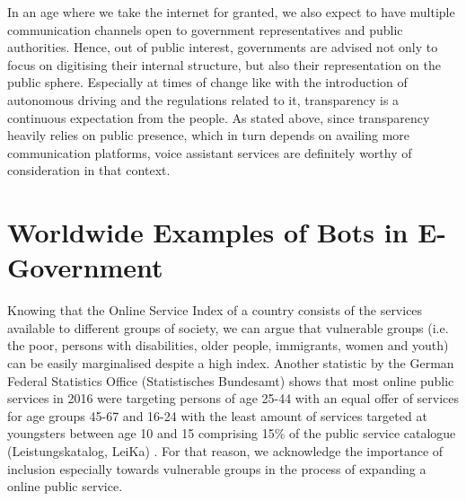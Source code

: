 In an age where we
take the internet for granted,
we also expect to have multiple communication channels open to government representatives and public authorities. 
%
Hence, out of public interest, governments are advised not only to focus on digitising their internal structure, but also their representation on the public sphere.
Especially at times of change like with the introduction of autonomous driving and the regulations related to it, transparency is a continuous expectation from the people. As stated above, since transparency heavily relies on public presence, which in turn depends on availing more communication platforms, voice assistant services are definitely worthy of consideration in that context.




\section{Worldwide Examples of Bots in E-Government}

Knowing that the Online Service Index of a country consists of the services available to different groups of society, we can argue that 
vulnerable groups (i.e. the poor, persons with disabilities, older people, immigrants, women and youth) can be easily marginalised despite a high index. Another statistic by the German Federal Statistics Office (Statistisches Bundesamt) shows that most online public services in 2016 were targeting persons of age 25-44 with an equal offer of services for age groups 45-67 and 16-24 with the least amount of services targeted at youngsters between age 10 and 15 comprising 15\% of the public service catalogue (Leistungskatalog, LeiKa) \cite{stabunda:leika}.
For that reason, we acknowledge the importance of inclusion especially towards vulnerable groups in the process of expanding a online public service.

